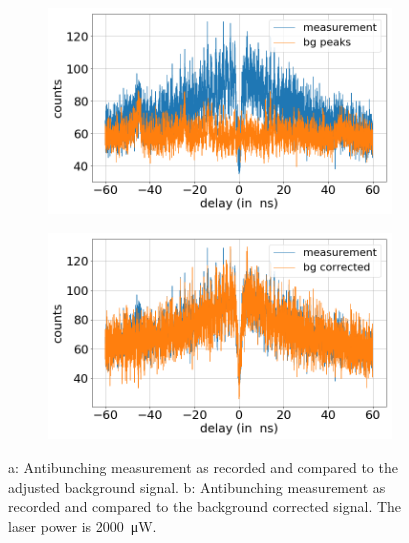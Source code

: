\begin{figure}[H]
    \centering
    \begin{subfigure}{0.47\textwidth}
        \centering
        \includegraphics[width=1.0\textwidth]{img/output_t2/2000.0muW_bg_peaks.png}
    \caption{}
    \end{subfigure}
    \begin{subfigure}{0.47\textwidth}
        \centering
        \includegraphics[width=\textwidth]{img/output_t2/2000.0muW_bg_vgl.png}
        \caption{}
    \end{subfigure}
    \caption{a: Antibunching measurement as recorded and compared to the adjusted background signal. b: Antibunching measurement as recorded and compared to the background corrected signal. The laser power is \SI{2000}{\micro W}.} %
\end{figure}

\newpage
